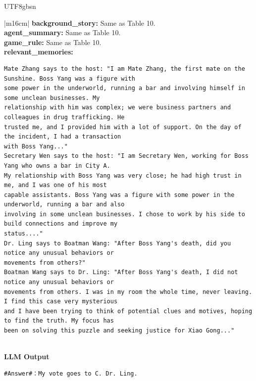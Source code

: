 \documentclass[11pt]{article}
\begin{document}
{\begin{CJK}{UTF8}{gbsn}
\begin{table}[ht!]
\begin{minipage}[t]{\linewidth}
\begin{tabular}{|m{16cm}|}
\textbf{   background\_story:} \small Same as Table 10. \\
\textbf{   agent\_summary:} \small Same as Table 10. \\
\textbf{   game\_rule:} \small Same as Table 10. \\
\textbf{   relevant\_memories:} \\
\begin{minipage}[t]{\linewidth}
\small\begin{verbatim}
Mate Zhang says to the host: "I am Mate Zhang, the first mate on the Sunshine. Boss Yang was a figure with 
some power in the underworld, running a bar and involving himself in some unclean businesses. My 
relationship with him was complex; we were business partners and colleagues in drug trafficking. He 
trusted me, and I provided him with a lot of support. On the day of the incident, I had a transaction
with Boss Yang..."  
Secretary Wen says to the host: "I am Secretary Wen, working for Boss Yang who owns a bar in City A.
My relationship with Boss Yang was very close; he had high trust in me, and I was one of his most 
capable assistants. Boss Yang was a figure with some power in the underworld, running a bar and also
involving in some unclean businesses. I chose to work by his side to build connections and improve my 
status...."  
Dr. Ling says to Boatman Wang: "After Boss Yang's death, did you notice any unusual behaviors or
movements from others?"  
Boatman Wang says to Dr. Ling: "After Boss Yang's death, I did not notice any unusual behaviors or
movements from others. I was in my room the whole time, never leaving. I find this case very mysterious 
and I have been trying to think of potential clues and motives, hoping to find the truth. My focus has 
been on solving this puzzle and seeking justice for Xiao Gong..."  

\end{verbatim}
\end{minipage} \\
\hline
{}  \textbf{LLM Output}  \\
\hline
\begin{minipage}[t]{\linewidth}
\small\begin{verbatim}
#Answer#：My vote goes to C. Dr. Ling.
\end{verbatim}
\end{minipage} \\
\hline
\end{tabular}
\end{minipage}


\end{table}
\end{CJK}}
\end{document}
